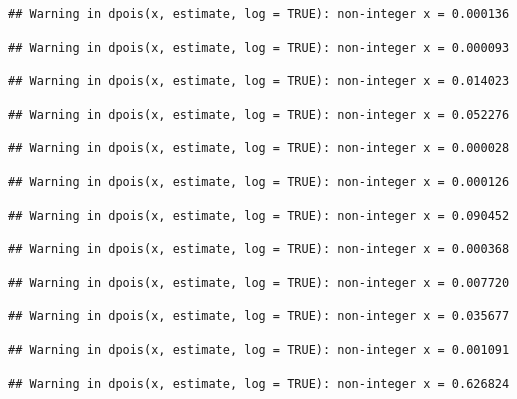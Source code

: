 \documentclass[]{article}
\begin{document}
\begin{verbatim}
## Warning in dpois(x, estimate, log = TRUE): non-integer x = 0.000136
\end{verbatim}

\begin{verbatim}
## Warning in dpois(x, estimate, log = TRUE): non-integer x = 0.000093
\end{verbatim}

\begin{verbatim}
## Warning in dpois(x, estimate, log = TRUE): non-integer x = 0.014023
\end{verbatim}

\begin{verbatim}
## Warning in dpois(x, estimate, log = TRUE): non-integer x = 0.052276
\end{verbatim}

\begin{verbatim}
## Warning in dpois(x, estimate, log = TRUE): non-integer x = 0.000028
\end{verbatim}

\begin{verbatim}
## Warning in dpois(x, estimate, log = TRUE): non-integer x = 0.000126
\end{verbatim}

\begin{verbatim}
## Warning in dpois(x, estimate, log = TRUE): non-integer x = 0.090452
\end{verbatim}

\begin{verbatim}
## Warning in dpois(x, estimate, log = TRUE): non-integer x = 0.000368
\end{verbatim}

\begin{verbatim}
## Warning in dpois(x, estimate, log = TRUE): non-integer x = 0.007720
\end{verbatim}

\begin{verbatim}
## Warning in dpois(x, estimate, log = TRUE): non-integer x = 0.035677
\end{verbatim}

\begin{verbatim}
## Warning in dpois(x, estimate, log = TRUE): non-integer x = 0.001091
\end{verbatim}

\begin{verbatim}
## Warning in dpois(x, estimate, log = TRUE): non-integer x = 0.626824
\end{verbatim}
\end{document}
